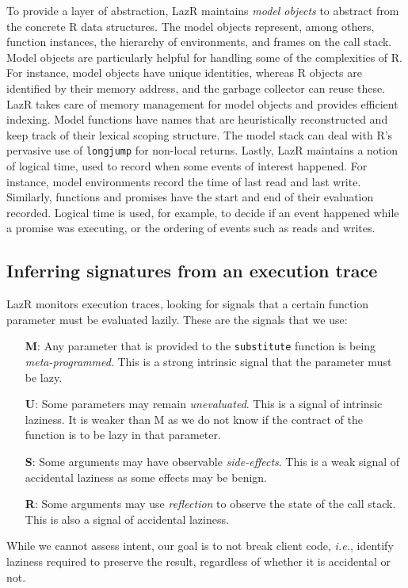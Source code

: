 \documentclass[review,creen,acmsmall]{acmart}
\renewcommand{\c}[1]{\lstinline |#1|\xspace}
\newcommand{\lazr}{{\sf LazR}\xspace}
\newcommand{\ie}{\emph{i.e.},\xspace}
\begin{document}
To provide a layer of abstraction, \lazr maintains \emph{model objects} to
abstract from the concrete R data structures. The model objects represent,
among others, function instances, the hierarchy of environments, and frames
on the call stack. Model objects are particularly helpful for handling some of the
complexities of R. For instance, model objects have unique identities, whereas R
objects are identified by their memory address, and the garbage collector can
reuse these. \lazr takes care of memory management for model objects and
provides efficient indexing. Model functions have names that are heuristically
reconstructed and keep track of their lexical scoping structure. The model stack
can deal with R's pervasive use of \c{longjump} for non-local returns. Lastly,
\lazr maintains a notion of logical time, used to record when some
events of interest happened. For instance, model environments record the time of
last read and last write. Similarly, functions and promises have the start and
end of their evaluation recorded. Logical time is used, for example, to decide
if an event happened while a promise was executing, or the ordering of events
such as reads and writes.

\subsection{Inferring signatures from an execution trace}

\lazr monitors execution traces, looking for signals that a certain function
parameter must be evaluated lazily. These are the signals that we use:
\begin{itemize}
\item[{\bf M}:] Any parameter that is provided to the \c{substitute} function is
  being \emph{meta-programmed}. This is a strong intrinsic signal that the parameter
  must be lazy.
\item[{\bf U}:] Some parameters may remain \emph{unevaluated}. This is a signal
  of intrinsic laziness. It is weaker than M as we do not know if the contract
  of the function is to be lazy in that parameter.
\item [{\bf S}:] Some arguments may have observable \emph{side-effects}. This is
  a weak signal of accidental laziness as some effects may be benign.
\item[{\bf R}:] Some arguments may use \emph{reflection} to observe the state of
  the call stack. This is also a signal of accidental laziness.
\end{itemize}
\noindent
While we cannot assess intent, our goal is to not break client code, \ie
identify laziness required to preserve the result, regardless of whether it is
accidental or not.
\end{document}
